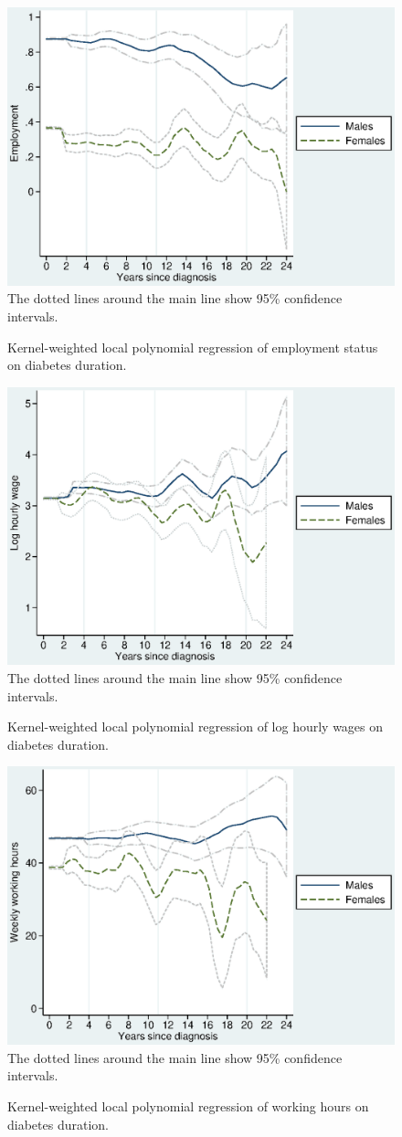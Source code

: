 \begin{figure}[h!]
\caption{\label{fig:Kernel-weighted-local-polynomial_empl}Kernel-weighted local
polynomial regression of employment status on diabetes duration.}%
\begin{center}
\includegraphics[width=0.5\columnwidth]{Chapter4/Figures/lpoly_works_diabetesduration.eps}\\
\footnotesize{The dotted lines around the main line show 95\% confidence intervals.}
\end{center}
\end{figure}
\FloatBarrier
\begin{figure}[h!]
\caption{\label{fig:Kernel-weighted-local-polynomial_wage}Kernel-weighted local
polynomial regression of log hourly wages on diabetes duration.}%
\begin{center}
\includegraphics[width=0.5\columnwidth]{Chapter4/Figures/lpoly_wage_diabetesduration.eps}\\
\footnotesize{The dotted lines around the main line show 95\% confidence intervals.}
\end{center}
\end{figure}

\begin{figure}[h!]
\caption{\label{fig:Kernel-weighted-local-polynomial_workhrs}Kernel-weighted local
polynomial regression of working hours on diabetes duration.}%
\begin{center}
\includegraphics[width=0.5\columnwidth]{Chapter4/Figures/lpoly_workhrs_diabetesduration.eps}\\
\footnotesize{The dotted lines around the main line show 95\% confidence intervals.}
\end{center}
\end{figure}
\FloatBarrier

